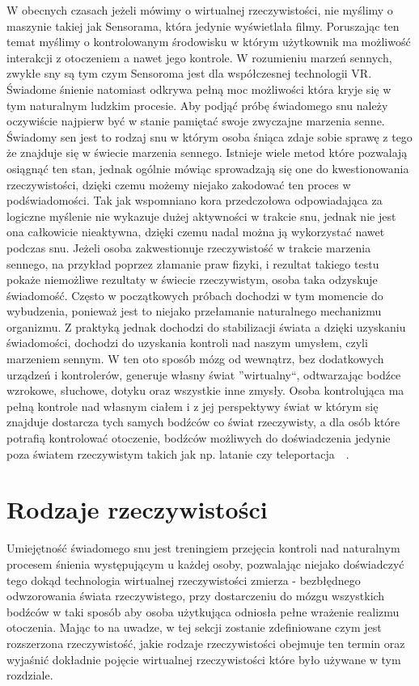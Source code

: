 W obecnych czasach jeżeli mówimy o wirtualnej rzeczywistości, nie myślimy o maszynie takiej jak Sensorama, która jedynie wyświetlała filmy. Poruszając ten temat myślimy o kontrolowanym środowisku w którym użytkownik ma możliwość interakcji z otoczeniem a nawet jego kontrole. W rozumieniu marzeń sennych, zwykłe sny są tym czym Sensoroma jest dla współczesnej technologii VR. Świadome śnienie natomiast odkrywa pełną moc możliwości która kryje się w tym naturalnym ludzkim procesie. Aby podjąć próbę świadomego snu należy oczywiście najpierw być w stanie pamiętać swoje zwyczajne marzenia senne. Świadomy sen jest to rodzaj snu w którym osoba śniąca zdaje sobie sprawę z tego że znajduje się w świecie marzenia sennego. Istnieje wiele metod które pozwalają osiągnąć ten stan, jednak ogólnie mówiąc sprowadzają się one do kwestionowania rzeczywistości, dzięki czemu możemy niejako zakodować ten proces w podświadomości. Tak jak wspomniano kora przedczołowa odpowiadająca za logiczne myślenie nie wykazuje dużej aktywności w trakcie snu, jednak nie jest ona całkowicie nieaktywna, dzięki czemu nadal można ją wykorzystać nawet podczas snu. Jeżeli osoba zakwestionuje rzeczywistość w trakcie marzenia sennego, na przykład poprzez złamanie praw fizyki, i rezultat takiego testu pokaże niemożliwe rezultaty w świecie rzeczywistym, osoba taka odzyskuje świadomość. Często w początkowych próbach dochodzi w tym momencie do wybudzenia, ponieważ jest to niejako przełamanie naturalnego mechanizmu organizmu. Z praktyką jednak dochodzi do stabilizacji świata a dzięki uzyskaniu świadomości, dochodzi do uzyskania kontroli nad naszym umysłem, czyli marzeniem sennym. W ten oto sposób mózg od wewnątrz, bez dodatkowych urządzeń i kontrolerów, generuje własny świat ''wirtualny``, odtwarzając bodźce wzrokowe, słuchowe, dotyku oraz wszystkie inne zmysły. Osoba kontrolująca ma pełną kontrole nad własnym ciałem i z jej perspektywy świat w którym się znajduje dostarcza tych samych bodźców co świat rzeczywisty, a dla osób które potrafią kontrolować otoczenie, bodźców możliwych do doświadczenia jedynie poza światem rzeczywistym takich jak np. latanie czy teleportacja~\cite{sen2}~\cite{sen1}. 		
	
\section{Rodzaje rzeczywistości}
\label{sec:rodzaje}
Umiejętność świadomego snu jest treningiem przejęcia kontroli nad naturalnym procesem śnienia występującym u każdej osoby, pozwalając niejako doświadczyć tego dokąd technologia wirtualnej rzeczywistości zmierza - bezbłędnego odwzorowania świata rzeczywistego, przy dostarczeniu do mózgu wszystkich bodźców w taki sposób aby osoba użytkująca odniosła pełne wrażenie realizmu otoczenia. Mając to na uwadze, w tej sekcji zostanie zdefiniowane czym jest rozszerzona rzeczywistość, jakie rodzaje rzeczywistości obejmuje ten termin oraz wyjaśnić dokładnie pojęcie wirtualnej rzeczywistości które było używane w tym rozdziale. 
